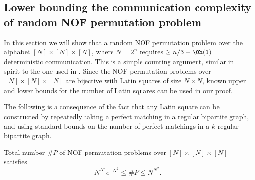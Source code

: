 \subsection{Lower bounding the communication complexity of random NOF permutation problem}

In this section we will show that a random NOF permutation problem over the alphabet $[N] \times [N] \times [N]$, where $N = 2^n$ requires $\geq n/3 - \Oh(1)$ deterministic communication. This is a simple counting argument, similar in spirit to the one used in \cite{DP08}. Since the NOF permutation problems over $[N] \times [N] \times [N]$ are bijective with Latin squares of size $N \times N$, known upper and lower bounds for the number of Latin squares can be used in our proof.

The following is a consequence of the fact that any Latin square can be constructed by repeatedly taking a perfect matching in a regular bipartite graph, and using standard bounds on the number of perfect matchings in a $k$-regular bipartite graph. 
\begin{theorem}[\cite{VW01}]
\label{thm:nof-number}
Total number $\#P$ of NOF permutation problems over $[N] \times [N] \times [N]$ satisfies
\begin{equation*}
    N^{N^2} e^{-N^2} \leq \#P \leq N^{N^2}.
\end{equation*}
\end{theorem}

